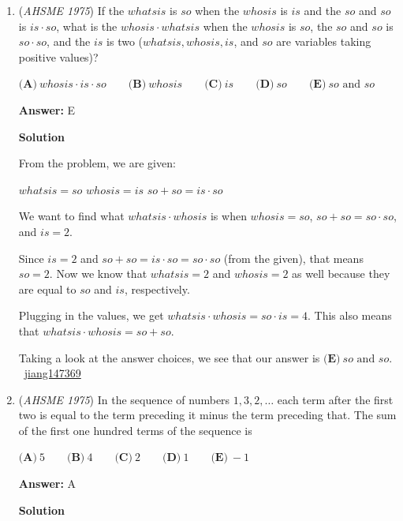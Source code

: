 \begin{enumerate}
 \begin{verbatim}
It is called the $\textbf {squeeze theorem}$
\end{verbatim}




	\item (\textit{AHSME 1975}) If the $whatsis$ is $so$ when the $whosis$ is $is$ and the $so$ and $so$ is $is \cdot so$, 
what is the $whosis \cdot whatsis$ when the $whosis$ is $so$, the $so$ and $so$ is $so \cdot so$, and the $is$ is two 
($whatsis, whosis, is$, and $so$ are variables taking positive values)? 


 $\textbf{(A)}\ whosis \cdot is \cdot so \qquad  \textbf{(B)}\ whosis \qquad  \textbf{(C)}\ is \qquad  \textbf{(D)}\ so\qquad \textbf{(E)}\ so\text{ and }so$

 \textbf{Answer: }E



\textbf{Solution}

From the problem, we are given:

  $whatsis = so$
$whosis = is$
$so + so = is \cdot so$ 

 We want to find what $whatsis \cdot whosis$ is when $whosis = so$, $so + so = so \cdot so$, and $is = 2$.

 Since $is = 2$ and $so + so = is \cdot so = so \cdot so$ (from the given), that means $so = 2$. Now we know that $whatsis = 2$ and $whosis = 2$ as well because they are equal to $so$ and $is$, respectively.

 Plugging in the values, we get $whatsis \cdot whosis = so \cdot is = 4$. This also means that $whatsis \cdot whosis = so + so$.

 Taking a look at the answer choices, we see that our answer is $\boxed{\textbf{(E)}\ so\text{ and }so}$. ~\href{https://artofproblemsolving.com/wiki/index.php/User:Jiang147369}{jiang147369}

 


	\item (\textit{AHSME 1975}) In the sequence of numbers $1, 3, 2, \ldots$ each term after the first two is equal to the term preceding it minus the term preceding that. 
The sum of the first one hundred terms of the sequence is 


 $\textbf{(A)}\ 5 \qquad  \textbf{(B)}\ 4 \qquad  \textbf{(C)}\ 2 \qquad  \textbf{(D)}\ 1 \qquad  \textbf{(E)}\ -1$

 \textbf{Answer: }A



\textbf{Solution}


\end{enumerate}
